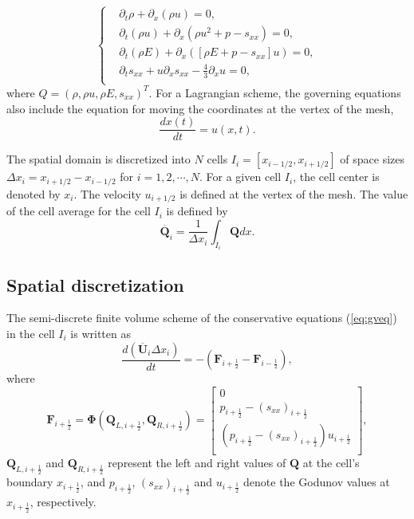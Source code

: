 \documentclass{article}
\numberwithin{equation}{section}
\numberwithin{table}{section}
\begin{document}
\begin{equation}\label{eq:gveq}
   \left\{ \begin{aligned}
	   & \partial _t \rho +\partial_x(\rho u)=0,\\
	   & \partial _t (\rho u)+\partial_x(\rho u^2 + p -s_{xx})=0,\\
	   &\partial _t (\rho E)+\partial_x([\rho E + p -s_{xx}]u)=0,\\
	   &\partial _t s_{xx}+u\partial_xs_{xx}-\frac{4}{3}\partial_x u=0,\\
	   \end{aligned}\right.
\end{equation}
where $Q = (\rho, \rho u, \rho E, s_{xx})^T$.  For a Lagrangian scheme, the governing equations also include the equation for moving the coordinates at the vertex of the mesh,
\begin{equation}\label{eq:dxt}
  \frac{dx(t)}{dt} = u(x,t).
\end{equation}

The spatial domain is discretized into $N$ cells $I_i = [x_{i-1/2}, x_{i+1/2}]$ of space sizes $\Delta x_i = x_{i+1/2} - x_{i-1/2}$ for $i = 1,2,\cdots,N$. For a given cell $I_i$, the cell center is denoted by $x_i$. The velocity $u_{i+1/2}$ is defined at the vertex of the mesh. The  value of the cell average for the cell $I_i$ is defined by
\begin{equation}
  \overline{\bm{Q}}_i = \frac{1}{\Delta x_i} \int_{I_i} \bm{Q} dx.
\end{equation}
\subsection{Spatial discretization}
The  semi-discrete finite volume scheme of the conservative equations (\ref{eq:gveq}) in the cell $I_i$ is written as
\begin{equation}\label{eq:sem}
  \frac{d(\overline{\bm{U}}_i\Delta x_i)}{dt} = -(\bm{F}_{i+\frac{1}{2}} - \bm{F}_{i-\frac{1}{2}}),
\end{equation}
where
\begin{equation}
  \bm{F}_{i+\frac{1}{2}} = \bm{\Phi} (\bm{Q}_{L,i+\frac{1}{2}}, \bm{Q}_{R,i+\frac{1}{2}})  = \left[
	\begin{array}{l}
	  0\\
	  p_{i+\frac{1}{2}} - (s_{xx})_{i+\frac{1}{2}}\\
	  (p_{i+\frac{1}{2}} - (s_{xx})_{i+\frac{1}{2}})u_{i+\frac{1}{2}}\\
	\end{array}
  \right],
\end{equation}
$\bm{Q}_{L,i+\frac{1}{2}}$ and $\bm{Q}_{R,i+\frac{1}{2}}$ represent the left and right values of $\bm{Q}$ at the cell's boundary $x_{i+\frac{1}{2}}$, and  $p_{i+\frac{1}{2}}$, $(s_{xx})_{i+\frac{1}{2}}$ and $u_{i+\frac{1}{2}}$ denote the Godunov values at $x_{i+\frac{1}{2}}$, respectively.
\end{document}
